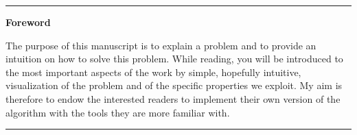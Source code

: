 
\begin{vcenterpage}
\noindent\rule[2pt]{\textwidth}{0.5pt}
\begin{center}
{\large\textbf{Foreword\\}}
\end{center}

The purpose of this manuscript is to explain a problem and to provide an intuition on how to solve this problem. While reading, you will be introduced to the most important aspects of the work by simple, hopefully intuitive, visualization of the problem and of the specific properties we exploit. My aim is therefore to endow the interested readers to implement their own version of the algorithm with the tools they are more familiar with.

\noindent\rule[2pt]{\textwidth}{0.5pt}
\end{vcenterpage}